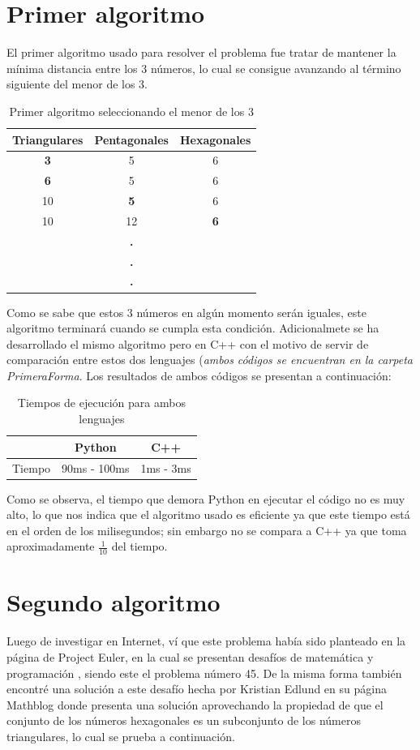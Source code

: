 \documentclass[12pt]{article}
\begin{document}
\section{Primer algoritmo}
El primer algoritmo usado para resolver el problema fue tratar de mantener la mínima distancia entre los 3 números, lo cual
se consigue avanzando al término siguiente del menor de los 3.

\begin{table}[H]
   \centering
   \begin{tabular}{ccc}
      Triangulares & Pentagonales & Hexagonales\\
      \hline
      {\textbf 3} & 5 & 6\\
      {\textbf 6} & 5 & 6\\
      10 & {\textbf 5} & 6\\
      10 & 12 & {\textbf 6}\\
      & {\textbf .} &\\
      & {\textbf .} &\\
      & {\textbf .} &\\
   \end{tabular}
   \caption{Primer algoritmo seleccionando el menor de los 3}
\end{table}

Como se sabe que estos 3 números en algún momento serán iguales, este algoritmo terminará cuando se cumpla esta condición.
Adicionalmete se ha desarrollado el mismo algoritmo pero en C++ con el motivo de servir de comparación entre estos dos
lenguajes (\textit{ambos códigos se encuentran en la carpeta PrimeraForma}. Los resultados de ambos códigos se presentan
a continuación:

\begin{table}[H]
   \centering
   \caption{Tiempos de ejecución para ambos lenguajes\protect\footnotemark}
   \begin{tabular}{ccc}
      & Python & C++\\
      \hline
      Tiempo & 90ms - 100ms & 1ms - 3ms\\
   \end{tabular}
\end{table}

Como se observa, el tiempo que demora Python en ejecutar el código no es muy alto, lo que nos indica que el algoritmo usado
es eficiente ya que este tiempo está en el orden de los milisegundos; sin embargo no se compara a C++ ya que toma aproximadamente $ \frac{1}{10} $ del tiempo.

\section{Segundo algoritmo}
Luego de investigar en Internet, ví que este problema había sido planteado en la página de Project Euler, en la cual se
presentan desafíos de matemática y programación \cite{peuler}, siendo este el problema número 45. De la misma forma también
encontré una solución a este desafío hecha por Kristian Edlund en su página Mathblog \cite{kris} donde presenta una solución
aprovechando la propiedad de que el conjunto de los números hexagonales es un subconjunto de los números triangulares, lo cual
se prueba a continuación.
\end{document}
